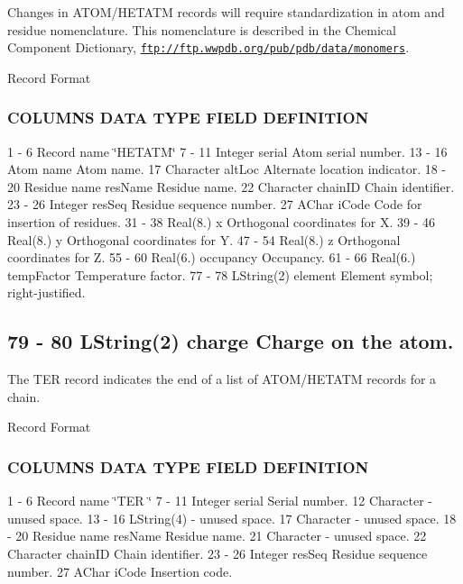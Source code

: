 Changes in A\+T\+O\+M/\+H\+E\+T\+A\+T\+M records will require standardization in atom and residue nomenclature. This nomenclature is described in the Chemical Component Dictionary, \href{ftp://ftp.wwpdb.org/pub/pdb/data/monomers}{\tt ftp\+://ftp.\+wwpdb.\+org/pub/pdb/data/monomers}.

Record Format

\subsubsection*{C\+O\+L\+U\+M\+N\+S D\+A\+T\+A T\+Y\+P\+E F\+I\+E\+L\+D D\+E\+F\+I\+N\+I\+T\+I\+O\+N }

1 -\/ 6 Record name \char`\"{}\+H\+E\+T\+A\+T\+M\char`\"{} 7 -\/ 11 Integer serial Atom serial number. 13 -\/ 16 Atom name Atom name. 17 Character alt\+Loc Alternate location indicator. 18 -\/ 20 Residue name res\+Name Residue name. 22 Character chain\+I\+D Chain identifier. 23 -\/ 26 Integer res\+Seq Residue sequence number. 27 A\+Char i\+Code Code for insertion of residues. 31 -\/ 38 Real(8.) x Orthogonal coordinates for X. 39 -\/ 46 Real(8.) y Orthogonal coordinates for Y. 47 -\/ 54 Real(8.) z Orthogonal coordinates for Z. 55 -\/ 60 Real(6.) occupancy Occupancy. 61 -\/ 66 Real(6.) temp\+Factor Temperature factor. 77 -\/ 78 L\+String(2) element Element symbol; right-\/justified. \subsection*{79 -\/ 80 L\+String(2) charge Charge on the atom. }

The T\+E\+R record indicates the end of a list of A\+T\+O\+M/\+H\+E\+T\+A\+T\+M records for a chain.

Record Format

\subsubsection*{C\+O\+L\+U\+M\+N\+S D\+A\+T\+A T\+Y\+P\+E F\+I\+E\+L\+D D\+E\+F\+I\+N\+I\+T\+I\+O\+N }

1 -\/ 6 Record name \char`\"{}\+T\+E\+R   \char`\"{} 7 -\/ 11 Integer serial Serial number. 12 Character -\/ unused space. 13 -\/ 16 L\+String(4) -\/ unused space. 17 Character -\/ unused space. 18 -\/ 20 Residue name res\+Name Residue name. 21 Character -\/ unused space. 22 Character chain\+I\+D Chain identifier. 23 -\/ 26 Integer res\+Seq Residue sequence number. 27 A\+Char i\+Code Insertion code.

